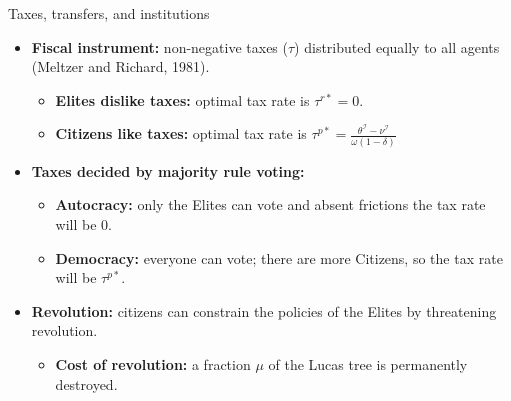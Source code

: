 \begin{frame}{Taxes, transfers, and institutions}
	\begin{itemize}
		\item<1-> \textbf{Fiscal instrument:} non-negative taxes ($\tau$) distributed equally to all agents (Meltzer and Richard, 1981).
		\vspace{.25cm}
		\begin{itemize}
			\item<2->[--] \textbf{Elites dislike taxes:} optimal tax rate is $\tau^{r*} = 0$.
			\vspace{.10cm}
			\item<2->[--]  \textbf{Citizens like taxes:} optimal tax rate is $\tau^{p*}=\frac{\theta^\mathcal{I}-\nu^\mathcal{I}}{\omega(1-\delta)}$
		\end{itemize}
		\vspace{.25cm}
		\item<3->  \textbf{Taxes decided by majority rule voting:}
			\vspace{.10cm}
		\begin{itemize}
			\item<4->[--] \textbf{Autocracy:} only the Elites can vote and absent frictions the tax rate will be 0.
			\vspace{.10cm}
			\item<4->[--] \textbf{Democracy:} everyone can vote; there are more Citizens, so the tax rate will be  $\tau^{p*}$.
		\end{itemize}
		\vspace{.25cm}
		\item<5-> \textbf{Revolution:} citizens can constrain the policies of the Elites by threatening revolution. 
		\begin{itemize}
			\vspace{.10cm}
			\item<5->[--] \textbf{Cost of revolution:} a fraction $\mu$ of the Lucas tree is permanently destroyed.
		\end{itemize}
	\end{itemize}
	
\end{frame}


